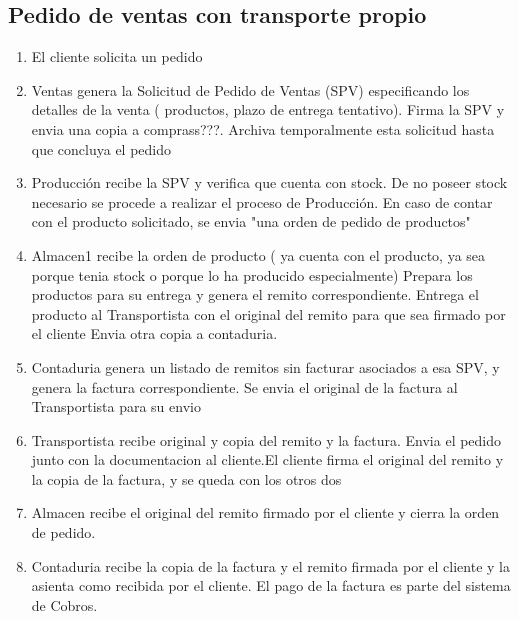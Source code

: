 \subsection{Pedido de ventas con transporte propio}
\begin{enumerate}
\item El cliente solicita un pedido
\item Ventas genera la Solicitud de Pedido de Ventas (SPV) especificando los detalles de la venta ( productos, plazo de entrega tentativo).
	Firma la SPV y envia una copia a comprass???. Archiva temporalmente esta solicitud hasta que concluya el pedido
\item Producci\'on recibe la SPV y verifica que cuenta con stock. De no poseer stock necesario se procede a realizar el proceso de Producci\'on. 
	En caso de contar con el producto solicitado, se envia "una orden de pedido de productos"
\item Almacen1 recibe la orden de producto ( ya cuenta con el producto, ya sea porque tenia stock o porque lo ha producido especialmente)
	Prepara los productos para su entrega y genera el remito correspondiente. Entrega el producto al Transportista con el original del remito para que sea firmado por el cliente
	Envia otra copia a contaduria.
\item Contaduria genera un listado de remitos sin facturar asociados a esa SPV, y genera la factura correspondiente. Se envia el original de la factura al Transportista para su envio
\item Transportista recibe original y copia del remito y la factura. Envia el pedido junto con la documentacion al cliente.El cliente firma el original del remito y la copia de la factura, y se queda con los otros dos
\item Almacen recibe el original del remito firmado por el cliente y cierra la orden de pedido. 
\item Contaduria recibe la copia de la factura y el remito firmada por el cliente y la asienta como recibida por el cliente. El pago de la factura es parte del sistema de Cobros.
\end{enumerate}